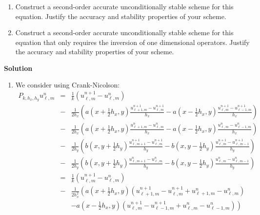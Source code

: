 \documentclass{article}
\begin{document}
\begin{enumerate}
\begin{enumerate}
\item Construct a second-order accurate unconditionally stable scheme for this equation.  Justify the accuracy and stability properties of your scheme.

\item Construct a second-order accurate unconditionally stable scheme for this equation that only requires the inversion of one dimensional operators.  Justify the accuracy and stability properties of your scheme.

\end{enumerate}

{\bf Solution}

\begin{enumerate}
\item We consider using Crank-Nicolson:
\begin{eqnarray*}
P_{k,h_x,h_y} u^n_{\ell,m}
& = & \frac{1}{k} \left( u^{n+1}_{\ell,m} - u^n_{\ell,m} \right) \\
& - & \frac{1}{2h_x} \left( a \left( x + \frac{1}{2} h_x, y \right) \frac{u^{n+1}_{\ell+1,m} - u^{n+1}_{\ell,m}}{h_x}
                          - a \left( x - \frac{1}{2} h_x, y \right) \frac{u^{n+1}_{\ell,m} - u^{n+1}_{\ell-1,m}}{h_x} \right) \\
& - & \frac{1}{2h_x} \left( a \left( x + \frac{1}{2} h_x, y \right) \frac{u^n_{\ell+1,m} - u^n_{\ell,m}}{h_x}
                          - a \left( x - \frac{1}{2} h_x, y \right) \frac{u^n_{\ell,m} - u^n_{\ell-1,m}}{h_x} \right) \\
& - & \frac{1}{2h_y} \left( b \left( x, y + \frac{1}{2} h_y \right) \frac{u^{n+1}_{\ell,m+1} - u^{n+1}_{\ell,m}}{h_y}
                          - b \left( x, y - \frac{1}{2} h_y \right) \frac{u^{n+1}_{\ell,m} - u^{n+1}_{\ell,m-1}}{h_y} \right) \\
& - & \frac{1}{2h_y} \left( b \left( x, y + \frac{1}{2} h_y \right) \frac{u^n_{\ell,m+1} - u^n_{\ell,m}}{h_y}
                          - b \left( x, y - \frac{1}{2} h_y \right) \frac{u^n_{\ell,m} - u^n_{\ell,m-1}}{h_y} \right) \\
& = & \frac{1}{k} \left( u^{n+1}_{\ell,m} - u^n_{\ell,m} \right) \\
& - & \frac{1}{2h_x^2} \left( a \left( x + \frac{1}{2} h_x, y \right) \left( u^{n+1}_{\ell+1,m} - u^{n+1}_{\ell,m} + u^n_{\ell+1,m} - u^n_{\ell,m} \right) \right. \\
&   & \left.                - a \left( x - \frac{1}{2} h_x, y \right) \left( u^{n+1}_{\ell,m} - u^{n+1}_{\ell-1,m} + u^n_{\ell,m} - u^n_{\ell-1,m} \right) \right) \\

\end{eqnarray*}
\end{enumerate}
\end{enumerate}
\end{document}
